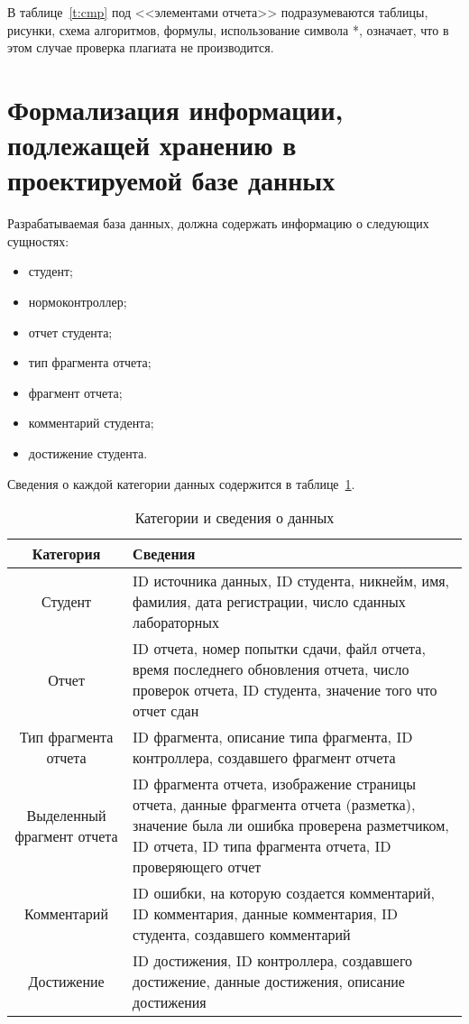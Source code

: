 В таблице~\ref{t:cmp} под <<элементами отчета>> подразумеваются таблицы, рисунки, схема алгоритмов, формулы, использование символа *, означает, что в этом случае проверка плагиата не производится.

\section{Формализация информации, подлежащей хранению в проектируемой базе данных}
Разрабатываемая база данных, должна содержать информацию о следующих сущностях:
\begin{itemize}
	\item студент;
	\item нормоконтроллер;
	\item отчет студента;
	\item тип фрагмента отчета;
	\item фрагмент отчета;
	\item комментарий студента;
	\item достижение студента.
\end{itemize}

Сведения о каждой категории данных содержится в таблице~\ref{t:data_store}.

\begin{table}[ht]
	\begin{center}
		\begin{threeparttable}
			\caption{\label{t:data_store} Категории и сведения о данных}
			\begin{tabular}{|c|p{8cm}|}
				\hline
				\textbf{Категория} & \textbf{Сведения} \\ \hline
				Студент & ID источника данных, ID студента, никнейм, имя, фамилия, дата регистрации, число сданных лабораторных\\ \hline
				Отчет & ID отчета, номер попытки сдачи, файл отчета, время последнего обновления отчета, число проверок отчета, ID студента, значение того что отчет сдан \\ \hline
				Тип фрагмента отчета & ID фрагмента, описание типа фрагмента, ID контроллера, создавшего фрагмент отчета \\ \hline
				Выделенный фрагмент отчета & ID фрагмента отчета, изображение страницы отчета, данные фрагмента отчета (разметка), значение была ли ошибка проверена разметчиком, ID отчета, ID типа фрагмента отчета, ID проверяющего отчет\\ \hline
				Комментарий & ID ошибки, на которую создается комментарий, ID комментария, данные комментария, ID студента, создавшего комментарий \\ \hline
				Достижение & ID достижения, ID контроллера, создавшего достижение, данные достижения, описание достижения \\ \hline
			\end{tabular}
		\end{threeparttable}
	\end{center}
\end{table}

